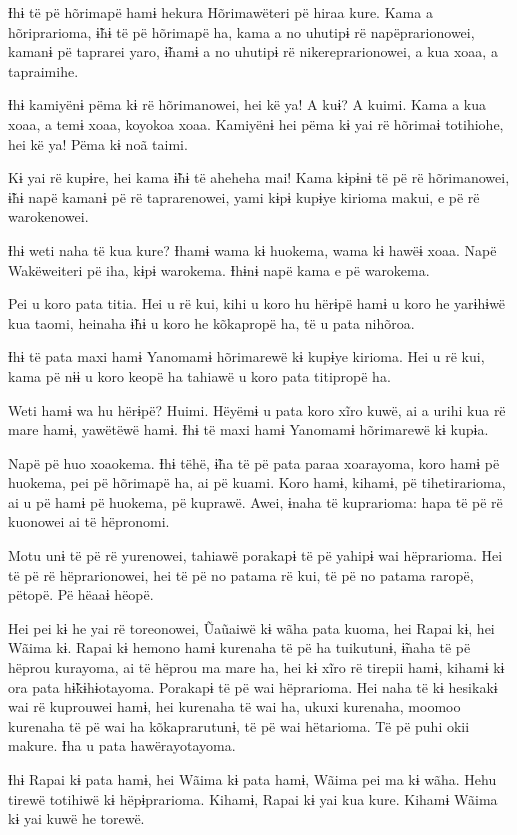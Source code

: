 Ɨhɨ të pë hõrimapë hamɨ hekura Hõrimawëteri pë hiraa kure. Kama a
hõriprarioma, ɨ̃hɨ të pë hõrimapë ha, kama a no uhutipɨ rë
napëprarionowei, kamanɨ pë taprarei yaro, ɨ̃hamɨ a no uhutipɨ rë
nikereprarionowei, a kua xoaa, a tapraimihe. 

Ɨhɨ kamiyënɨ pëma kɨ rë hõrimanowei, hei kë ya! A kuɨ? A kuimi. Kama a
kua xoaa, a temɨ xoaa, koyokoa xoaa. Kamiyënɨ hei pëma kɨ yai rë hõrimaɨ
totihiohe, hei kë ya! Pëma kɨ noã taimi. 

Kɨ yai rë kupɨre, hei kama ɨ̃hɨ të aheheha mai! Kama kɨpɨnɨ të pë rë
hõrimanowei, ɨ̃hɨ napë kamanɨ pë rë taprarenowei, yami kɨpɨ kupɨye
kirioma makui, e pë rë warokenowei. 

Ɨhɨ weti naha të kua kure? Ɨhamɨ wama kɨ huokema, wama kɨ hawëɨ xoaa.
Napë Wakëweiteri pë iha, kɨpɨ warokema. Ɨhɨnɨ napë kama e pë warokema. 

Pei u koro pata titia. Hei u rë kui, kihi u koro hu hërɨpë hamɨ u koro
he yarɨhɨwë kua taomi, heinaha ɨ̃hɨ u koro he kõkapropë ha, të u pata
nihõroa. 

Ɨhɨ të pata maxi hamɨ Yanomamɨ hõrimarewë kɨ kupɨye kirioma. Hei u rë
kui, kama pë nɨɨ u koro keopë ha tahiawë u koro pata titipropë ha. 

Weti hamɨ wa hu hërɨpë? Huimi. Hëyëmɨ u pata koro xĩro kuwë, ai a urihi
kua rë mare hamɨ, yawëtëwë hamɨ. Ɨhɨ të maxi hamɨ Yanomamɨ hõrimarewë kɨ
kupɨa. 

Napë pë huo xoaokema. Ɨhɨ tëhë, ɨ̃ha të pë pata paraa xoarayoma, koro
hamɨ pë huokema, pei pë hõrimapë ha, ai pë kuami. Koro hamɨ, kihamɨ, pë
tihetirarioma, ai u pë hamɨ pë huokema, pë kuprawë. Awei, ɨnaha të
kuprarioma: hapa të pë rë kuonowei ai të hëpronomi. 

Motu unɨ të pë rë yurenowei, tahiawë porakapɨ të pë yahipɨ wai
hëprarioma. Hei të pë rë hëprarionowei, hei të pë no patama rë kui, të
pë no patama raropë, pëtopë. Pë hëaaɨ hëopë. 

Hei pei kɨ he yai rë toreonowei, Ũaũaiwë kɨ wãha pata kuoma, hei Rapai
kɨ, hei Wãima kɨ. Rapai kɨ hemono hamɨ kurenaha të pë ha tuikutunɨ,
ɨ̃naha të pë hëprou kurayoma, ai të hëprou ma mare ha, hei kɨ xĩro rë
tirepii hamɨ, kihamɨ kɨ ora pata hɨ̃kɨhɨotayoma. Porakapɨ të pë wai
hëprarioma. Hei naha të kɨ hesikakɨ wai rë kuprouwei hamɨ, hei kurenaha
të wai ha, ukuxi kurenaha, moomoo kurenaha të pë wai ha kõkaprarutunɨ,
të pë wai hëtarioma. Të pë puhi okii makure. Ɨha u pata hawërayotayoma.

Ɨhɨ Rapai kɨ pata hamɨ, hei Wãima kɨ pata hamɨ, Wãima pei ma kɨ wãha.
Hehu tirewë totihiwë kɨ hëpɨprarioma. Kihamɨ, Rapai kɨ yai kua kure.
Kihamɨ Wãima kɨ yai kuwë he torewë. 

